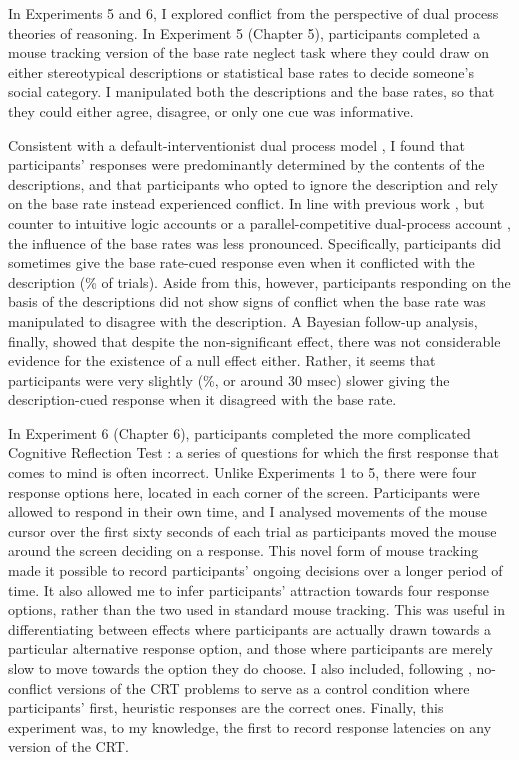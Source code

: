 In Experiments 5 and 6,
I explored conflict from the perspective of
dual process theories of reasoning.
In Experiment 5 (Chapter 5),
participants completed a mouse tracking version of
the base rate neglect task \citep{Kahneman1973,DeNeys2008}
where they could draw on either stereotypical descriptions
or statistical base rates to decide someone's social category.
I manipulated both the descriptions and the base rates,
so that they could either agree, disagree,
or only one cue was informative.

Consistent with a default-interventionist dual process model \citep[i.e.][]{Evans2006},
I found that participants' responses were predominantly determined by
the contents of the descriptions,
and that participants who opted to ignore the description
and rely on the base rate instead experienced conflict.
In line with previous work \citep[e.g.][]{Tversky1982,Kahneman1973},
but counter to intuitive logic accounts \citep{DeNeys2008,Pennycook2014}
or a parallel-competitive dual-process account \citep{Sloman1996},
the influence of the base rates was less pronounced.
Specifically, participants did sometimes give the base rate-cued response
even when it conflicted with the description (\% of trials).
Aside from this, however,
participants responding on the basis of the descriptions
did not show signs of conflict when the base rate was manipulated
to disagree with the description.
A Bayesian follow-up analysis, finally,
showed that despite the non-significant effect,
there was not considerable evidence for the existence of a null effect either.
Rather, it seems that participants were
very slightly (\%, or around 30 msec) slower
giving the description-cued response
when it disagreed with the base rate.

In Experiment 6 (Chapter 6),
participants completed the more complicated
Cognitive Reflection Test \citep[CRT;][]{Frederick2005}:
a series of questions for which
the first response that comes to mind is often incorrect.
Unlike Experiments 1 to 5,
there were four response options here,
located in each corner of the screen.
Participants were allowed to respond in their own time,
and I analysed movements of the mouse cursor
over the first sixty seconds of each trial
as  participants moved the mouse around the screen deciding on a response.
This novel form of mouse tracking
made it possible to record participants' ongoing decisions over a longer period of time.
It also allowed me to infer participants' attraction towards four response options,
rather than the two used in standard mouse tracking.
This was useful in differentiating between
effects where participants are actually drawn
towards a particular alternative response option,
and those where participants are merely slow
to move towards the option they do choose.
I also included, following \citet{DeNeys2013a},
no-conflict versions of the CRT problems
to serve as a control condition where
participants' first, heuristic responses are the correct ones.
Finally, this experiment was, to my knowledge,
the first to record response latencies on any version of the CRT.

